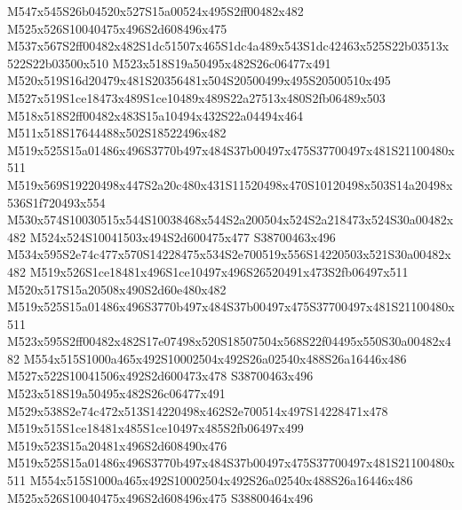 \documentclass{article}
\begin{document}
\begin{multicols}{2}
M547x545S26b04520x527S15a00524x495S2ff00482x482 M525x526S10040475x496S2d608496x475 M537x567S2ff00482x482S1dc51507x465S1dc4a489x543S1dc42463x525S22b03513x522S22b03500x510 M523x518S19a50495x482S26c06477x491 M520x519S16d20479x481S20356481x504S20500499x495S20500510x495 M527x519S1ce18473x489S1ce10489x489S22a27513x480S2fb06489x503 M518x518S2ff00482x483S15a10494x432S22a04494x464 M511x518S17644488x502S18522496x482 M519x525S15a01486x496S3770b497x484S37b00497x475S37700497x481S21100480x511 M519x569S19220498x447S2a20c480x431S11520498x470S10120498x503S14a20498x536S1f720493x554 M530x574S10030515x544S10038468x544S2a200504x524S2a218473x524S30a00482x482 M524x524S10041503x494S2d600475x477 S38700463x496 M534x595S2e74c477x570S14228475x534S2e700519x556S14220503x521S30a00482x482 M519x526S1ce18481x496S1ce10497x496S26520491x473S2fb06497x511 M520x517S15a20508x490S2d60e480x482 M519x525S15a01486x496S3770b497x484S37b00497x475S37700497x481S21100480x511 M523x595S2ff00482x482S17e07498x520S18507504x568S22f04495x550S30a00482x482 M554x515S1000a465x492S10002504x492S26a02540x488S26a16446x486 M527x522S10041506x492S2d600473x478 S38700463x496 M523x518S19a50495x482S26c06477x491 M529x538S2e74c472x513S14220498x462S2e700514x497S14228471x478 M519x515S1ce18481x485S1ce10497x485S2fb06497x499 M519x523S15a20481x496S2d608490x476 M519x525S15a01486x496S3770b497x484S37b00497x475S37700497x481S21100480x511 M554x515S1000a465x492S10002504x492S26a02540x488S26a16446x486 M525x526S10040475x496S2d608496x475 S38800464x496







\end{multicols}
\end{document}
